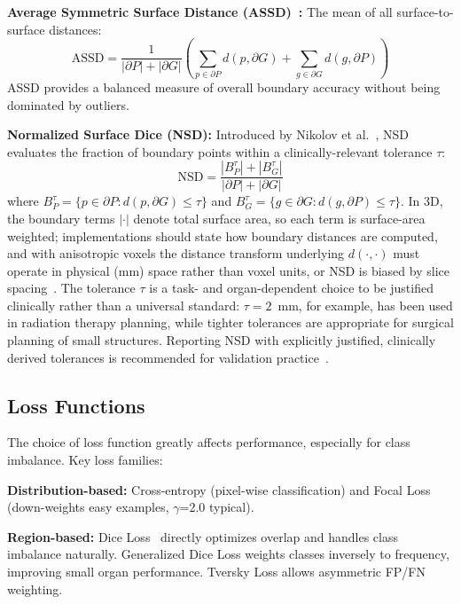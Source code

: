 \textbf{Average Symmetric Surface Distance (ASSD)~\cite{heimann2009comparison}:} The mean of all surface-to-surface distances:
\begin{equation}
\text{ASSD} = \frac{1}{|\partial P| + |\partial G|}\left(\sum_{p \in \partial P} d(p, \partial G) + \sum_{g \in \partial G} d(g, \partial P)\right)
\end{equation}
ASSD provides a balanced measure of overall boundary accuracy without being dominated by outliers.

\textbf{Normalized Surface Dice (NSD):} Introduced by Nikolov et al.~\cite{nikolov2021clinically}, NSD evaluates the fraction of boundary points within a clinically-relevant tolerance $\tau$:
\begin{equation}
\text{NSD} = \frac{|B_P^\tau| + |B_G^\tau|}{|\partial P| + |\partial G|}
\end{equation}
where $B_P^\tau = \{p \in \partial P : d(p, \partial G) \leq \tau\}$ and $B_G^\tau = \{g \in \partial G : d(g, \partial P) \leq \tau\}$. In 3D, the boundary terms $|\cdot|$ denote total surface area, so each term is surface-area weighted; implementations should state how boundary distances are computed, and with anisotropic voxels the distance transform underlying $d(\cdot,\cdot)$ must operate in physical (mm) space rather than voxel units, or NSD is biased by slice spacing~\cite{maierhein2024metrics}. The tolerance $\tau$ is a task- and organ-dependent choice to be justified clinically rather than a universal standard: $\tau = 2$~mm, for example, has been used in radiation therapy planning, while tighter tolerances are appropriate for surgical planning of small structures. Reporting NSD with explicitly justified, clinically derived tolerances is recommended for validation practice~\cite{maierhein2024metrics}.

\subsection{Loss Functions}
\label{sec:loss_functions}

The choice of loss function greatly affects performance, especially for class imbalance. Key loss families:

\textbf{Distribution-based:} Cross-entropy (pixel-wise classification) and Focal Loss~\cite{lin2017focal} (down-weights easy examples, $\gamma$=2.0 typical).

\textbf{Region-based:} Dice Loss~\cite{milletari2016vnet} directly optimizes overlap and handles class imbalance naturally. Generalized Dice Loss weights classes inversely to frequency, improving small organ performance. Tversky Loss allows asymmetric FP/FN weighting.

